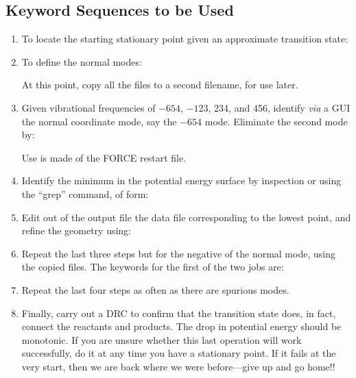 \subsection*{Keyword Sequences to be Used}
\begin{enumerate}
\item To locate the starting stationary point  given  an  approximate
transition state: 

\item To define the normal modes: 

At this point, copy all the files to a second filename, for use later.

\item Given vibrational frequencies of $-654$, $-123$,  234,  and  456,
identify  {\em via} a GUI the normal coordinate mode,  say the  $-654$ mode. 
Eliminate the second mode by:


Use is made of the FORCE restart file.

\item Identify  the  minimum  in  the  potential  energy  surface  by
inspection or using the ``grep'' command, of form:


\item Edit out of the output file the data file corresponding to  the lowest
point, and refine the geometry using: 

\item Repeat the last three steps but for the negative of the  normal mode, 
using  the  copied files.  The keywords for the first of the two jobs are:


\item Repeat the last four steps  as  often  as  there  are  spurious
modes.

\item Finally, carry out a DRC to confirm that the  transition  state does, in
fact, connect the reactants and products.  The drop in potential energy 
should  be  monotonic.   If  you  are  unsure whether  this  last  operation
will work successfully, do it at any time you have a stationary point.  If it
fails at the  very start,  then we are back where we were before---give up
and go home!!
\end{enumerate}

